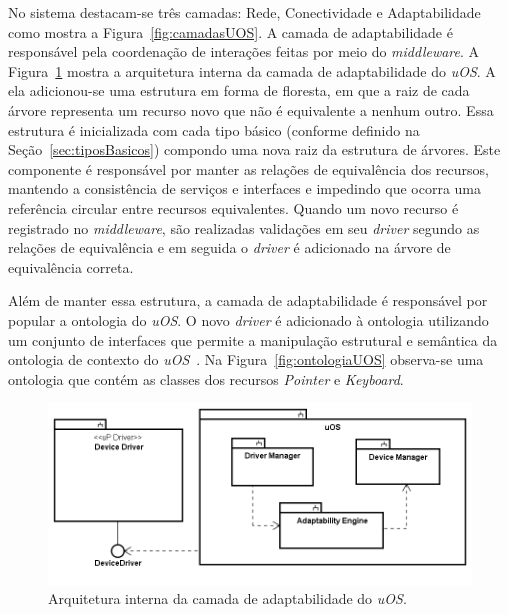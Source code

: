 No sistema destacam-se três camadas: Rede, Conectividade e Adaptabilidade como mostra a Figura~\ref{fig:camadasUOS}. A camada de adaptabilidade é responsável pela coordenação de interações feitas por meio do \emph{middleware}. A Figura~\ref{fig:diagramaDeBlocos} mostra a arquitetura interna da camada de adaptabilidade do \emph{uOS}. A ela adicionou-se uma estrutura em forma de floresta, em que a raiz de cada árvore representa um recurso novo que não é equivalente a nenhum outro. Essa estrutura é inicializada com cada tipo básico (conforme definido na Seção~\ref{sec:tiposBasicos}) compondo uma nova raiz da estrutura de árvores. Este componente é responsável por manter as relações de equivalência dos recursos, mantendo a consistência de serviços e interfaces e impedindo que ocorra uma referência circular entre recursos equivalentes. Quando um novo recurso é registrado no \emph{middleware}, são realizadas validações em seu \emph{driver} segundo as relações de equivalência e em seguida o \emph{driver} é adicionado na árvore de equivalência correta.

Além de manter essa estrutura, a camada de adaptabilidade é responsável por popular a ontologia do \emph{uOS}. O novo \emph{driver} é adicionado à ontologia utilizando um conjunto de interfaces que permite a manipulação estrutural e semântica da ontologia de contexto do \emph{uOS}~\cite{ozakisbcup2011}. Na Figura~\ref{fig:ontologiaUOS} observa-se uma ontologia que contém as classes dos recursos \emph{Pointer} e \emph{Keyboard}.

\begin{figure}[ht]
	\center
	\includegraphics[scale=0.6]{imagens/diagramaDeBlocos}
	\caption{Arquitetura interna da camada de adaptabilidade do \emph{uOS}.}
	\label{fig:diagramaDeBlocos}
\end{figure}

